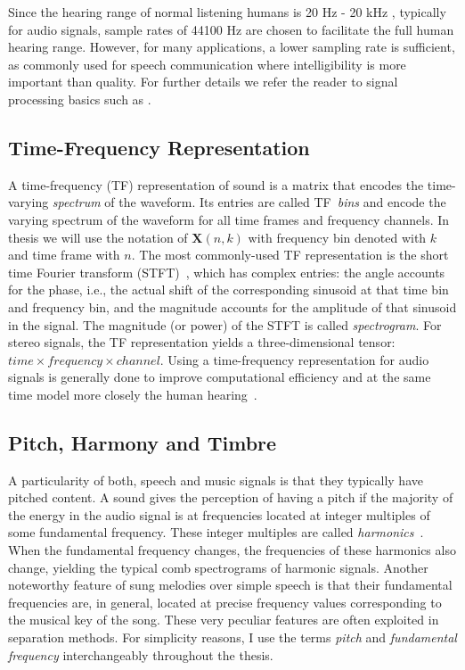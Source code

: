 Since the hearing range of normal listening humans is 20 Hz - 20 kHz \cite{fastl90, moore89}, typically for audio signals, sample rates of 44100 Hz are chosen to facilitate the full human hearing range.
However, for many applications, a lower sampling rate is sufficient, as commonly used for speech communication where intelligibility is more important than quality.
For further details we refer the reader to signal processing basics such as \cite{proakis96, oppenheim97}.

\hypertarget{time-frequency-representation}{%
\subsection{Time-Frequency
Representation}\label{time-frequency-representation}}


A time-frequency (TF) representation of sound is a matrix that encodes the time-varying \textit{spectrum} of the waveform. Its entries are called TF~\textit{bins} and encode the varying spectrum of the waveform for all time frames and frequency channels. In thesis we will use the notation of \(\mathbf{X}(n, k)\) with frequency bin denoted with \(k\) and time frame with \(n\).
The most commonly-used TF representation is the short time Fourier transform (STFT)~\cite{mcaulay86}, which has complex entries: the angle accounts for the phase, i.e., the actual shift of the corresponding sinusoid at that time bin and frequency bin, and the magnitude accounts for the amplitude of that sinusoid in the signal.
The magnitude (or power) of the STFT is called \textit{spectrogram}.
For stereo signals, the TF representation yields a three-dimensional tensor: ${time} \times frequency \times channel$.
Using a time-frequency representation for audio signals is generally done to improve computational efficiency and at the same time model more closely
the human hearing~\cite{bregman90}.

\subsection{Pitch, Harmony and Timbre}

A particularity of both, speech and music signals is that they typically have pitched content.
A sound gives the perception of having a pitch if the majority of the energy in the audio signal is at frequencies located at integer multiples of some fundamental frequency.
These integer multiples are called \textit{harmonics}~\cite{schenker54}.
When the fundamental frequency changes, the frequencies of these harmonics also change, yielding the typical comb spectrograms of harmonic signals.
Another noteworthy feature of sung melodies over simple speech is that their fundamental frequencies are, in general, located at precise frequency values corresponding to the musical key of the song.
These very peculiar features are often exploited in separation methods.
For simplicity reasons, I use the terms \textit{pitch} and \textit{fundamental frequency} interchangeably throughout the thesis.

